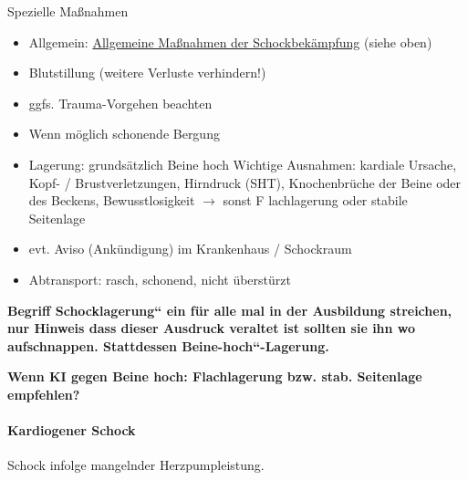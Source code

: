 \documentclass{article}
\begin{document}
{\mdseries\color{black}
Spezielle Ma{\ss}nahmen}

\begin{itemize}
\item {\mdseries\color[rgb]{0.0,0.0,0.5019608}
Allgemein:
\hyperlink{a761AllgemeineManahmenderSchockbekmpfungoutline}{Allgemeine
Ma{\ss}nahmen der Schockbek\"ampfung} (siehe oben) }

\item {\mdseries\color[rgb]{0.0,0.0,0.5019608}
Blutstillung  (weitere Verluste verhindern!)}

\item {\mdseries\color[rgb]{0.0,0.0,0.5019608}
ggfs. Trauma-Vorgehen beachten}

\item {\mdseries\color[rgb]{0.0,0.0,0.5019608}
%
%
Wenn m\"oglich schonende Bergung}

\item {\mdseries\color[rgb]{0.0,0.0,0.5019608}
Lagerung: grunds\"atzlich %
%
Beine hoch \newline
Wichtige Ausnahmen: {\textperiodcentered} kardiale Ursache,
{\textperiodcentered} Kopf- / Brust\-ver\-letzungen,
{\textperiodcentered} Hirndruck (SHT),  {\textperiodcentered}
Knochenbr\"uche der Beine oder des Beckens, {\textperiodcentered}
Bewusstlosigkeit\newline
${\rightarrow}$ sonst F%
%
lachlagerung oder stabile Seitenlage}

\item {\mdseries\color[rgb]{0.0,0.0,0.5019608}
evt. Aviso (Ank\"undigung) im  Krankenhaus / Schockraum}

\item {\mdseries\color[rgb]{0.0,0.0,0.5019608}
Abtransport: rasch, schonend, nicht \"uberst\"urzt}

\end{itemize}
{\bfseries\color[rgb]{0.5019608,0.0,0.0}
Begriff {\quotedblbase}Schocklagerung{\textquotedblleft} ein f\"ur alle
mal in der Ausbildung streichen, nur Hinweis dass dieser Ausdruck
veraltet ist sollten sie ihn wo aufschnappen. Stattdessen
{\quotedblbase}Beine-hoch{\textquotedblleft}-Lagerung.}

{\bfseries\color[rgb]{0.5019608,0.0,0.0}
Wenn KI gegen Beine hoch: Flachlagerung bzw. stab. Seitenlage
empfehlen?}

\paragraph{Kardiogener Schock}
{\mdseries
Schock infolge mangelnder Herzpumpleistung.}
\end{document}
